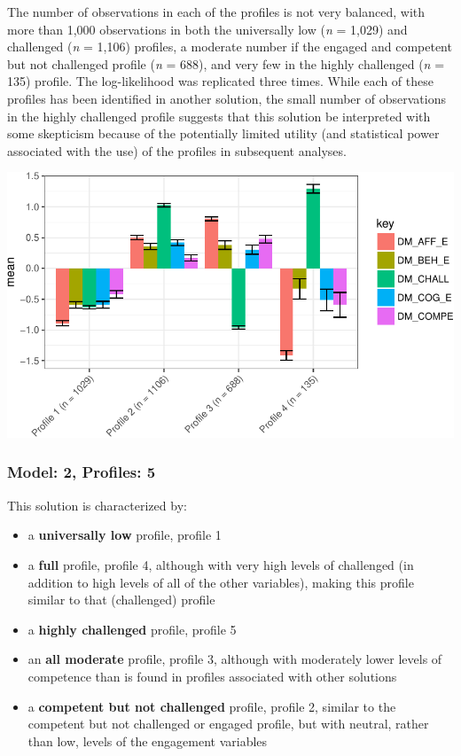 \documentclass[]{book}
\providecommand{\tightlist}{%
  \setlength{\itemsep}{0pt}\setlength{\parskip}{0pt}}
\theoremstyle{definition}
\theoremstyle{definition}
\theoremstyle{definition}
\theoremstyle{remark}
\begin{document}
The number of observations in each of the profiles is not very balanced,
with more than 1,000 observations in both the universally low (\emph{n}
= 1,029) and challenged (\emph{n} = 1,106) profiles, a moderate number
if the engaged and competent but not challenged profile (\emph{n} =
688), and very few in the highly challenged (\emph{n} = 135) profile.
The log-likelihood was replicated three times. While each of these
profiles has been identified in another solution, the small number of
observations in the highly challenged profile suggests that this
solution be interpreted with some skepticism because of the potentially
limited utility (and statistical power associated with the use) of the
profiles in subsequent analyses.

\begin{center}\includegraphics[width=0.8\linewidth]{rosenberg-dissertation_files/figure-latex/m2_4p-1} \end{center}

\subsubsection{Model: 2, Profiles: 5}\label{model-2-profiles-5}

This solution is characterized by:

\begin{itemize}
\tightlist
\item
  a \textbf{universally low} profile, profile 1
\item
  a \textbf{full} profile, profile 4, although with very high levels of
  challenged (in addition to high levels of all of the other variables),
  making this profile similar to that (challenged) profile
\item
  a \textbf{highly challenged} profile, profile 5
\item
  an \textbf{all moderate} profile, profile 3, although with moderately
  lower levels of competence than is found in profiles associated with
  other solutions
\item
  a \textbf{competent but not challenged} profile, profile 2, similar to
  the competent but not challenged or engaged profile, but with neutral,
  rather than low, levels of the engagement variables
\end{itemize}
\end{document}
